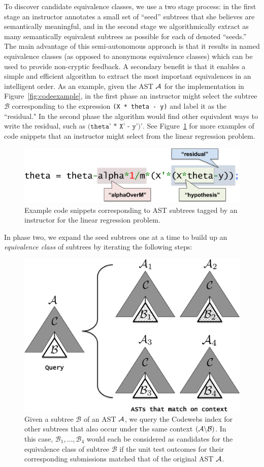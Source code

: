 To discover candidate equivalence classes, we use a two stage process: in the first stage an instructor annotates a small set of ``seed'' subtrees 
that she believes are semantically meaningful, and in the second stage we algorithmically extract as many semantically equivalent subtrees as possible for each of denoted ``seeds.'' The main advantage of this semi-autonomous approach is that it results in named equivalence 
classes (as opposed to anonymous equivalence classes) which can be used to provide non-cryptic feedback. A secondary benefit 
is that it enables a simple and efficient algorithm to extract the most important equivalences in an intelligent order. As an example, given the AST $\mathcal{A}$ for the implementation in 
Figure~\ref{fig:codeexample},
 in the first phase an instructor might select the subtree $\mathcal{B}$ corresponding to the expression \texttt{(X * theta - y)} and label it as the ``residual." In the second phase the algorithm would find other equivalent ways to write the residual, such as $\texttt{(theta' * X' - y')'}$.
See Figure~\ref{fig:tagging} for more  examples of code snippets that an instructor might select from the linear
 regression problem.

 \begin{figure}[t]
\center
\includegraphics[width=.35\textwidth]{img/taggingexample.pdf}
\caption[Example tagged code]{
Example code snippets corresponding to AST subtrees tagged by an instructor for the linear regression problem.
}
\label{fig:tagging}
\end{figure}

In phase two, we expand the seed subtrees one at a time to build up an \emph{equivalence class}
of subtrees by iterating the following steps:
		
\begin{figure}[t!]
\center
\includegraphics[width=.35\textwidth]{img/cartoon.pdf}
\caption[Equivalence class candidates]{
Given a subtree $\mathcal{B}$ of an AST $\mathcal{A}$, we query the Codewebs index
for other subtrees that also occur under the same context $(\mathcal{A}\backslash\mathcal{B})$.
In this case, $\mathcal{B}_1, \dots, \mathcal{B}_4$ would each be considered
as candidates for the equivalence class of subtree $\mathcal{B}$ if the unit test outcomes for their
corresponding submissions matched that of the original AST $\mathcal{A}$.
}
\label{fig:cartoon}
\end{figure}

